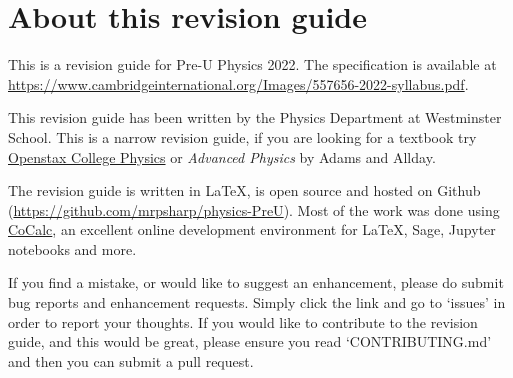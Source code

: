 \documentclass[revision-guide.tex]{subfiles}
\begin{document}
\chapter{About this revision guide}

This is a revision guide for Pre-U Physics 2022. The specification is available at \url{https://www.cambridgeinternational.org/Images/557656-2022-syllabus.pdf}.

This revision guide has been written by the Physics Department at Westminster School. This is a narrow revision guide, if you are looking for a textbook try \href{https://openstax.org/details/books/college-physics}{Openstax College Physics} or \emph{Advanced Physics} by Adams and Allday.

The revision guide is written in \LaTeX, is open source and hosted on Github (\url{https://github.com/mrpsharp/physics-PreU}). Most of the work was done using \href{https://cocalc.com/}{CoCalc}, an excellent online development environment for \LaTeX, Sage, Jupyter notebooks and more.


If you find a mistake, or would like to suggest an enhancement, please do submit bug reports and enhancement requests. Simply click the link and go to `issues' in order to report your thoughts. If you would like to contribute to the revision guide, and this would be great, please ensure you read `CONTRIBUTING.md' and then you can submit a pull request.
\end{document}

